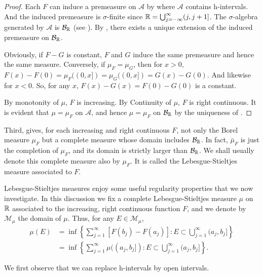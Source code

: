 \begin{proof}
    Each $F$ can induce a premeasure on $\mathcal{A}$ by  where $\mathcal{A}$ contains h-intervals.
    And the induced premeasure is $\sigma$-finite since $\mathbb{R} = \bigcup_{j=-\infty}^{\infty}(j, j+1]$.
    The $\sigma$-algebra generated by $\mathcal{A}$ is $\mathcal{B}_{\mathbb{R}}$ (see ).
    By , there exists a unique extension of the induced premeasure on $\mathcal{B}_{\mathbb{R}}$.

    Obviously, if $F - G$ is constant, $F$ and $G$ induce the same premeasure and hence the same measure.
    Conversely, if $\mu_F = \mu_G$, then for $x > 0$, $F(x) - F(0) = \mu_F((0, x]) = \mu_G((0, x]) = G(x) - G(0)$.
    And likewise for $x < 0$. 
    So, for any $x$, $F(x) - G(x) = F(0) - G(0)$ is a constant.
    
    By monotonity of $\mu$, $F$ is increasing.
    By Continuity of $\mu$, $F$ is right continuous.
    It is evident that $\mu=\mu_F$ on $\mathcal{A}$, and hence $\mu=\mu_F$ on $\mathcal{B}_{\mathbb{R}}$ by the uniqueness of .
\end{proof}

Third,  gives, for each increasing and right continuous $F$, not only the Borel measure $\mu_F$ but a complete measure whose domain includes $\mathcal{B}_{\mathbb{R}}$.
In fact, $\bar{\mu}_F$ is just the completion of $\mu_F$, and its domain is strictly larger than $\mathcal{B}_{\mathbb{R}}$. 
We shall usually denote this complete measure also by $\mu_F$.
It is called the Lebesgue-Stieltjes measure associated to $F$.

Lebesgue-Stieltjes measures enjoy some useful regularity properties that we now investigate.
In this discussion we fix a complete Lebesgue-Stieltjes measure $\mu$ on $\mathbb{R}$ associated to the increasing, right continuous function $F$, and we denote by $\mathcal{M}_{\mu}$ the domain of $\mu$.
Thus, for any $E \in \mathcal{M}_{\mu}$, 
\begin{align}
    \mu(E) &= \inf \left\{ \sum_{j=1}^{\infty} [F(b_j) - F(a_j)]: E \subset \bigcup_{j=1}^{\infty} (a_j, b_j] \right\} \\
    &= \inf \left\{ \sum_{j=1}^{\infty} \mu((a_j, b_j]): E \subset \bigcup_{j=1}^{\infty} (a_j, b_j] \right\}.
\end{align}

We first observe that we can replace h-intervals by open intervals.

